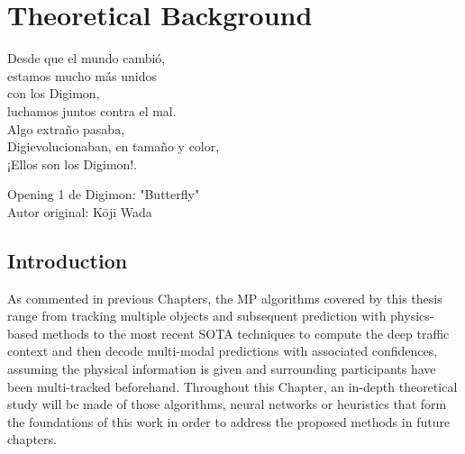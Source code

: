 % 
% 
% 
% 
% 
% 
% 

\chapter{Theoretical Background}
\label{cha:theoretical_background}

\begin{FraseCelebre}
	\begin{Frase}
		Desde que el mundo cambió, \\
		estamos mucho más unidos \\
		con los Digimon, \\
		luchamos juntos contra el mal. \\ 

		Algo extraño pasaba, \\
		Digievolucionaban, 
		en tamaño y color, \\
		¡Ellos son los Digimon!. 
	\end{Frase}
	\begin{Fuente}
		Opening 1 de Digimon: "Butterfly" \\
		Autor original: Kōji Wada
	\end{Fuente}
\end{FraseCelebre}

\section{Introduction}
\label{sec:3_introduction}

As commented in previous Chapters, the \ac{MP} algorithms covered by this thesis range from tracking multiple objects and subsequent prediction with physics-based methods to the most recent \ac{SOTA} techniques to compute the deep traffic context and then decode multi-modal predictions with associated confidences, assuming the physical information is given and surrounding participants have been multi-tracked beforehand. Throughout this Chapter, an in-depth theoretical study will be made of those algorithms, neural networks or heuristics that form the foundations of this work in order to address the proposed methods in future chapters.

